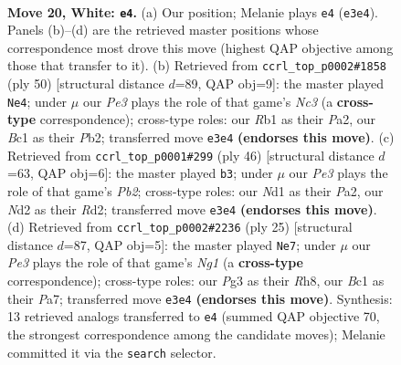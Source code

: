 \documentclass[11pt]{article}
\begin{document}
\clearpage

\begin{figure}[p]\centering
\begin{subfigure}{0.46\textwidth}\centering
\resizebox{\linewidth}{!}{%
\newchessgame
\chessboard[
  setfen={1nb2rk1/r5b1/1p3n2/p1p1pp2/2P3p1/1P2P1P1/P2N1PB1/1RBNR1K1 w - - 0 20},
  showmover=false,
  pgfstyle=straightmove, color=movearrow, markmove={e3-e4}
]}
\caption{}
\end{subfigure}\hfill
\begin{subfigure}{0.46\textwidth}\centering
\resizebox{\linewidth}{!}{%
\newchessgame
\chessboard[
  setfen={r4rk1/2p3bb/pp1p1n1p/3Pp3/2P4N/2N2PP1/PP1B1R1P/4R1K1 w - - 0 26},
  showmover=false,
  pgfstyle=straightmove, color=movearrow, markmove={c3-e4}
]}
\caption{}
\end{subfigure}
\\[4pt]
\begin{subfigure}{0.46\textwidth}\centering
\resizebox{\linewidth}{!}{%
\newchessgame
\chessboard[
  setfen={1r1r1n2/pp1bNpbk/3P2p1/2p1p1Pp/4P2P/2N2P2/PP1RB3/2K2R2 w - - 11 24},
  showmover=false,
  pgfstyle=straightmove, color=movearrow, markmove={b2-b3}
]}
\caption{}
\end{subfigure}\hfill
\begin{subfigure}{0.46\textwidth}\centering
\resizebox{\linewidth}{!}{%
\newchessgame
\chessboard[
  setfen={r3kbnr/pp3pp1/4p2p/3pP2P/1n1P4/8/PP1NNPP1/R1B2K1R b kq - 2 13},
  showmover=false,
  pgfstyle=straightmove, color=movearrow, markmove={g8-e7}
]}
\caption{}
\end{subfigure}
\caption{\textbf{Move 20, White: \texttt{e4}.} (a) Our position; Melanie plays \texttt{e4} (\texttt{e3e4}). Panels (b)--(d) are the retrieved master positions whose correspondence most drove this move (highest QAP objective among those that transfer to it). (b) Retrieved from \texttt{ccrl\_top\_p0002\#1858} (ply 50) [structural distance $d$=89, QAP obj=9]: the master played \texttt{Ne4}; under $\mu$ our \emph{Pe3} plays the role of that game's \emph{Nc3} (a \textbf{cross-type} correspondence); cross-type roles: our \emph{R}b1 as their \emph{P}a2, our \emph{B}c1 as their \emph{P}b2; transferred move \texttt{e3e4} \textbf{(endorses this move)}. (c) Retrieved from \texttt{ccrl\_top\_p0001\#299} (ply 46) [structural distance $d$=63, QAP obj=6]: the master played \texttt{b3}; under $\mu$ our \emph{Pe3} plays the role of that game's \emph{Pb2}; cross-type roles: our \emph{N}d1 as their \emph{P}a2, our \emph{N}d2 as their \emph{R}d2; transferred move \texttt{e3e4} \textbf{(endorses this move)}. (d) Retrieved from \texttt{ccrl\_top\_p0002\#2236} (ply 25) [structural distance $d$=87, QAP obj=5]: the master played \texttt{Ne7}; under $\mu$ our \emph{Pe3} plays the role of that game's \emph{Ng1} (a \textbf{cross-type} correspondence); cross-type roles: our \emph{P}g3 as their \emph{R}h8, our \emph{B}c1 as their \emph{P}a7; transferred move \texttt{e3e4} \textbf{(endorses this move)}. Synthesis: 13 retrieved analogs transferred to \texttt{e4} (summed QAP objective 70, the strongest correspondence among the candidate moves); Melanie committed it via the \texttt{search} selector.}
\label{fig:thought-m38}
\end{figure}
\end{document}
